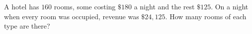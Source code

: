 A hotel has $160$ rooms, some costing $\$180$ a night and the rest $\$125$. On a night when every room was occupied, revenue was $\$24{,}125$. How many rooms of each type are there?
